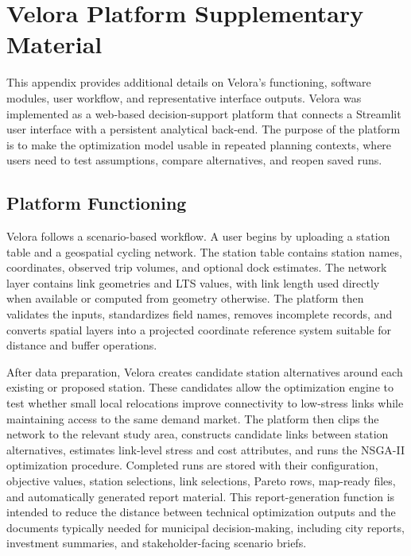 \documentclass[preprint,authoryear,10pt]{elsarticle}
\begin{document}
\appendix
\setcounter{figure}{0}
\setcounter{table}{0}
\renewcommand{\thefigure}{\thesection\arabic{figure}}
\renewcommand{\thetable}{\thesection\arabic{table}}
\renewcommand{\theequation}{\thesection\arabic{equation}}

\section{Velora Platform Supplementary Material}\label{app:velora_platform}

This appendix provides additional details on Velora's functioning, software modules, user workflow, and representative interface outputs. Velora was implemented as a web-based decision-support platform that connects a Streamlit user interface with a persistent analytical back-end. The purpose of the platform is to make the optimization model usable in repeated planning contexts, where users need to test assumptions, compare alternatives, and reopen saved runs.

\subsection{Platform Functioning}

Velora follows a scenario-based workflow. A user begins by uploading a station table and a geospatial cycling network. The station table contains station names, coordinates, observed trip volumes, and optional dock estimates. The network layer contains link geometries and LTS values, with link length used directly when available or computed from geometry otherwise. The platform then validates the inputs, standardizes field names, removes incomplete records, and converts spatial layers into a projected coordinate reference system suitable for distance and buffer operations.

After data preparation, Velora creates candidate station alternatives around each existing or proposed station. These candidates allow the optimization engine to test whether small local relocations improve connectivity to low-stress links while maintaining access to the same demand market. The platform then clips the network to the relevant study area, constructs candidate links between station alternatives, estimates link-level stress and cost attributes, and runs the NSGA-II optimization procedure. Completed runs are stored with their configuration, objective values, station selections, link selections, Pareto rows, map-ready files, and automatically generated report material. This report-generation function is intended to reduce the distance between technical optimization outputs and the documents typically needed for municipal decision-making, including city reports, investment summaries, and stakeholder-facing scenario briefs.
\end{document}
